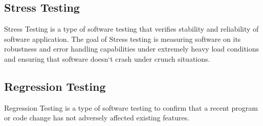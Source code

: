 \subsection{Stress Testing}
Stress Testing is a type of software testing that verifies stability and reliability of software application.
The goal of Stress testing is measuring software on its robustness and error handling capabilities
under extremely heavy load conditions and ensuring that software doesn`t crash under crunch
situations.
\subsection{Regression Testing}
Regression Testing is a type of software testing to confirm that a recent program or code change has
not adversely affected existing features.